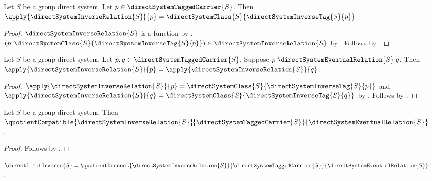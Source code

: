 \begin{proposition}\label{direct_system_inverse_relation_apply}
    Let $S$ be a group direct system.
    Let $p\in\directSystemTaggedCarrier{S}$.
    Then $\apply{\directSystemInverseRelation{S}}{p}
        =\directSystemClass{S}{\directSystemInverseTag{S}{p}}$.
\end{proposition}
\begin{proof}
    $\directSystemInverseRelation{S}$ is a function by
        .
    $(p,\directSystemClass{S}{\directSystemInverseTag{S}{p}})
        \in\directSystemInverseRelation{S}$ by
        .
    Follows by .
\end{proof}

\begin{lemma}\label{direct_system_inverse_relation_respects_equivalence}
    Let $S$ be a group direct system.
    Let $p,q\in\directSystemTaggedCarrier{S}$.
    Suppose $p\mathrel{\directSystemEventualRelation{S}}q$.
    Then $\apply{\directSystemInverseRelation{S}}{p}
        =\apply{\directSystemInverseRelation{S}}{q}$.
\end{lemma}
\begin{proof}
    $\apply{\directSystemInverseRelation{S}}{p}
        =\directSystemClass{S}{\directSystemInverseTag{S}{p}}$ and
        $\apply{\directSystemInverseRelation{S}}{q}
        =\directSystemClass{S}{\directSystemInverseTag{S}{q}}$ by
        .
    Follows by
        .
\end{proof}

\begin{theorem}\label{direct_system_inverse_relation_compatible}
    Let $S$ be a group direct system.
    Then $\quotientCompatible
        {\directSystemInverseRelation{S}}
        {\directSystemTaggedCarrier{S}}
        {\directSystemEventualRelation{S}}$.
\end{theorem}
\begin{proof}
    Follows by
        .
\end{proof}

\begin{definition}\label{group_direct_limit_inverse}
    $\directLimitInverse{S}=
        \quotientDescent
            {\directSystemInverseRelation{S}}
            {\directSystemTaggedCarrier{S}}
            {\directSystemEventualRelation{S}}$.
\end{definition}

